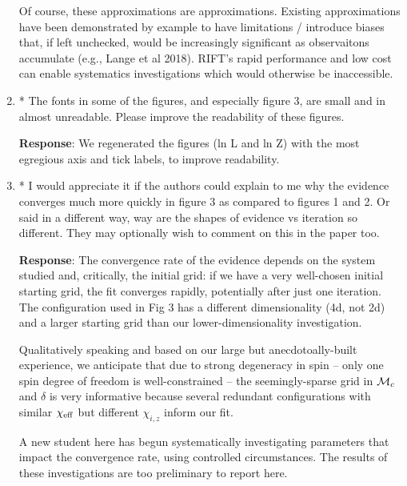 \documentclass[onecolumn]{revtex4}
\begin{document}
\begin{enumerate}
Of course, these approximations are approximations.  Existing approximations  have been demonstrated by example to have limitations /
introduce biases that, if left unchecked, would be increasingly significant as observaitons accumulate (e.g., Lange et
al 2018).  RIFT's rapid performance  and low cost can enable systematics investigations which would otherwise be inaccessible.


\item * The fonts in some of the figures, and especially figure 3, are small
and in almost unreadable. Please improve the readability of these
figures.

\noindent \textbf{Response}:  We regenerated the figures (ln L and ln Z) with the most egregious axis and tick labels, to improve readability.


\item * I would appreciate it if the authors could explain to me why the
evidence converges much more quickly in figure 3 as compared to
figures 1 and 2. Or said in a different way, way are the shapes of
evidence vs iteration so different. They may optionally wish to
comment on this in the paper too.

\noindent \textbf{Response}:  The convergence rate of the evidence depends on the system studied and, critically, the
initial grid: if we have a very well-chosen initial starting grid, the fit  converges rapidly, potentially after just
one iteration.  The configuration used
in Fig 3 has a different dimensionality (4d, not 2d) and a larger starting  grid than our lower-dimensionality investigation.

Qualitatively speaking and based on our large but anecdotoally-built experience, we anticipate that  due to strong degeneracy in
spin -- only one spin degree of freedom is well-constrained -- the seemingly-sparse grid in ${\cal M}_c$ and $\delta$ is very
informative because several redundant configurations with similar $\chi_{\rm eff}$ but different $\chi_{i,z}$ inform our
fit.   

A new  student here has begun systematically investigating parameters that impact the convergence rate, using controlled
circumstances. The results of these investigations are too preliminary to report here.

\end{enumerate}
\end{document}
